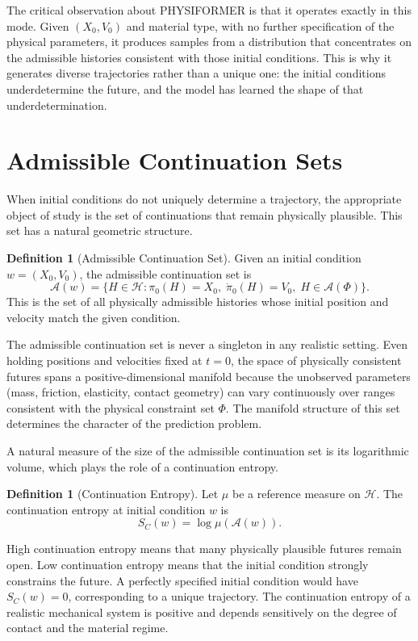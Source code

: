 \documentclass[12pt,oneside]{article}
\theoremstyle{definition}
\newtheorem{definition}[theorem]{Definition}
\newcommand{\A}{\mathcal{A}}
\newcommand{\H}{\mathcal{H}}
\begin{document}
The critical observation about PHYSIFORMER is that it operates exactly in this mode.
Given \((X_0, V_0)\) and material type, with no further specification of the physical
parameters, it produces samples from a distribution that concentrates on the admissible
histories consistent with those initial conditions. This is why it generates diverse
trajectories rather than a unique one: the initial conditions underdetermine the future,
and the model has learned the shape of that underdetermination.

\section{Admissible Continuation Sets}

When initial conditions do not uniquely determine a trajectory, the appropriate object
of study is the set of continuations that remain physically plausible. This set has a
natural geometric structure.

\begin{definition}[Admissible Continuation Set]
Given an initial condition \(w = (X_0, V_0)\), the admissible continuation set is
\[
\A(w) = \{H \in \H : \pi_0(H) = X_0, \; \dot{\pi}_0(H) = V_0, \; H \in \A(\Phi)\}.
\]
This is the set of all physically admissible histories whose initial position and velocity
match the given condition.
\end{definition}

The admissible continuation set is never a singleton in any realistic setting. Even
holding positions and velocities fixed at \(t = 0\), the space of physically consistent
futures spans a positive-dimensional manifold because the unobserved parameters
(mass, friction, elasticity, contact geometry) can vary continuously over ranges
consistent with the physical constraint set \(\Phi\). The manifold structure of this
set determines the character of the prediction problem.

A natural measure of the size of the admissible continuation set is its logarithmic
volume, which plays the role of a continuation entropy.

\begin{definition}[Continuation Entropy]
Let \(\mu\) be a reference measure on \(\H\). The continuation entropy at initial
condition \(w\) is
\[
S_C(w) = \log \mu(\A(w)).
\]
\end{definition}

High continuation entropy means that many physically plausible futures remain open.
Low continuation entropy means that the initial condition strongly constrains the future.
A perfectly specified initial condition would have \(S_C(w) = 0\), corresponding to a
unique trajectory. The continuation entropy of a realistic mechanical system is positive
and depends sensitively on the degree of contact and the material regime.
\end{document}
